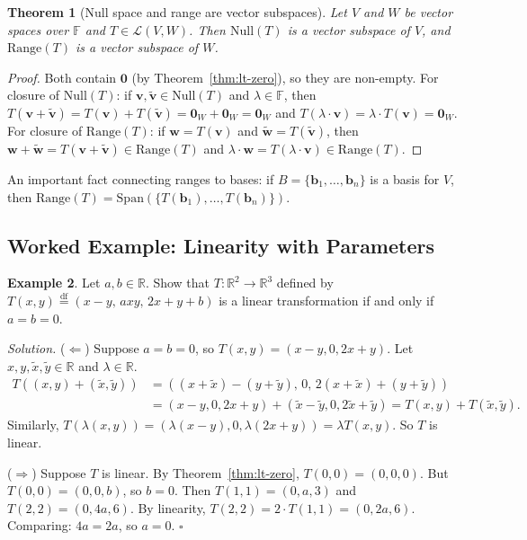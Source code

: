 \documentclass[11pt, a4paper, notitlepage]{report}
\newtheorem{theorem}{Theorem}[section]
\theoremstyle{definition}
\newtheorem{example}[theorem]{Example}
\theoremstyle{remark}
\begin{document}
\begin{theorem}[Null space and range are vector subspaces]\label{thm:null-range-subspaces}
Let $V$ and $W$ be vector spaces over $\mathbb{F}$ and $T \in \mathcal{L}(V,W)$.
Then $\mathrm{Null}(T)$ is a vector subspace of $V$, and $\mathrm{Range}(T)$ is a vector subspace of $W$.
\end{theorem}
\begin{proof}
Both contain $\mathbf{0}$ (by Theorem~\ref{thm:lt-zero}), so they are non-empty.
For closure of $\mathrm{Null}(T)$: if $\mathbf{v}, \tilde{\mathbf{v}} \in \mathrm{Null}(T)$ and $\lambda \in \mathbb{F}$, then
$T(\mathbf{v} + \tilde{\mathbf{v}}) = T(\mathbf{v}) + T(\tilde{\mathbf{v}}) = \mathbf{0}_W + \mathbf{0}_W = \mathbf{0}_W$
and $T(\lambda \cdot \mathbf{v}) = \lambda \cdot T(\mathbf{v}) = \mathbf{0}_W$.
For closure of $\mathrm{Range}(T)$: if $\mathbf{w} = T(\mathbf{v})$ and $\tilde{\mathbf{w}} = T(\tilde{\mathbf{v}})$,
then $\mathbf{w} + \tilde{\mathbf{w}} = T(\mathbf{v} + \tilde{\mathbf{v}}) \in \mathrm{Range}(T)$ and
$\lambda \cdot \mathbf{w} = T(\lambda \cdot \mathbf{v}) \in \mathrm{Range}(T)$.
\end{proof}

An important fact connecting ranges to bases: if $B = \{\mathbf{b}_1, \ldots, \mathbf{b}_n\}$ is a basis
for $V$, then $\mathrm{Range}(T) = \mathrm{Span}(\{T(\mathbf{b}_1), \ldots, T(\mathbf{b}_n)\})$.

\subsection{Worked Example: Linearity with Parameters}

\begin{example}\label{ex:lt-parameter}
Let $a, b \in \mathbb{R}$. Show that $T : \mathbb{R}^2 \to \mathbb{R}^3$ defined by
$T(x,y) \stackrel{\mathrm{df}}{=} (x-y,\, axy,\, 2x+y+b)$ is a linear transformation if and only if $a = b = 0$.

\emph{Solution.}
($\Leftarrow$) Suppose $a = b = 0$, so $T(x,y) = (x-y, 0, 2x+y)$. Let $x,y,\tilde{x},\tilde{y} \in \mathbb{R}$ and $\lambda \in \mathbb{R}$.
\begin{align*}
  T((x,y)+(\tilde{x},\tilde{y})) &= ((x+\tilde{x})-(y+\tilde{y}),\, 0,\, 2(x+\tilde{x})+(y+\tilde{y})) \\
  &= (x-y,0,2x+y) + (\tilde{x}-\tilde{y},0,2\tilde{x}+\tilde{y}) = T(x,y)+T(\tilde{x},\tilde{y}).
\end{align*}
Similarly, $T(\lambda(x,y)) = (\lambda(x-y), 0, \lambda(2x+y)) = \lambda T(x,y)$. So $T$ is linear.

($\Rightarrow$) Suppose $T$ is linear. By Theorem~\ref{thm:lt-zero}, $T(0,0) = (0,0,0)$.
But $T(0,0) = (0, 0, b)$, so $b = 0$.
Then $T(1,1) = (0, a, 3)$ and $T(2,2) = (0, 4a, 6)$.
By linearity, $T(2,2) = 2 \cdot T(1,1) = (0, 2a, 6)$.
Comparing: $4a = 2a$, so $a = 0$. $\square$
\end{example}
\end{document}
